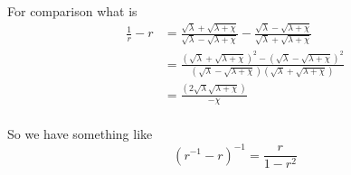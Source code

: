   For comparison what is 
  \begin{align}
    \frac{1}{r}- r &= \frac{\sqrt{\lambda}+\sqrt{\lambda+\chi}}{\sqrt{\lambda}-\sqrt{\lambda+\chi}}
    - \frac{\sqrt{\lambda}-\sqrt{\lambda+\chi}}{\sqrt{\lambda}+\sqrt{\lambda+\chi}}\\
&= \frac{(\sqrt{\lambda}+\sqrt{\lambda+\chi})^2 - (\sqrt{\lambda}-\sqrt{\lambda+\chi})^2}
    {(\sqrt{\lambda}-\sqrt{\lambda+\chi})(\sqrt{\lambda}+\sqrt{\lambda+\chi})}\\
&= \frac{(2\sqrt{\lambda}\sqrt{\lambda+\chi})}
    {-\chi}\\
  \end{align}
  
  So we have something like 
  \begin{equation}
    (r^{-1}-r)^{-1} = \frac{r}{1-r^2}
  \end{equation}



